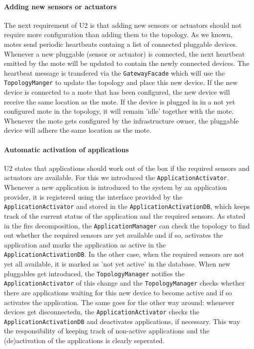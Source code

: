 \documentclass[english]{sareport}
\begin{document}
\paragraph{Adding new sensors or actuators}
The next requirement of U2 is that adding new sensors or actuators should not require more configuration than adding them to the topology. As we known, motes send periodic heartbeats containg a list of connected pluggable devices. Whenever a new pluggable (sensor or actuator) is connected, the next heartbeat emitted by the mote will be updated to contain the newly connected devices. The heartbeat message is transfered via the \texttt{GatewayFacade} which will use the \texttt{TopologyManger} to update the topology and place this new device. If the new device is connected to a mote that has been configured, the new device will receive the same location as the mote. If the device is plugged in in a not yet configured mote in the topology, it will remain 'idle' together with the mote. Whenever the mote gets configured by the infrastructure owner, the pluggable device will adhere the same location as the mote.

\paragraph{Automatic activation of applications}
U2 states that applications should work out of the box if the required sensors and actuators are available. For this we introduced the \texttt{ApplicationActivator}. Whenever a new application is introduced to the system by an application provider, it is registered using the interface provided by the \texttt{ApplicationActivator} and stored in the \texttt{ApplicationActivationDB}, which keeps track of the current status of the application and the required sensors. As stated in the firs decomposition, the \texttt{ApplicationManager} can check the topology to find out whether the required sensors are yet available and if so, activates the application and marks the application as active in the \texttt{ApplicationActivationDB}. In the other case, when the required sensors are not yet all available, it is marked as 'not yet active' in the database. When new pluggables get introduced, the \texttt{TopologyManager} notifies the \texttt{ApplicationActivator} of this change and the \texttt{TopologyManager} checks whether there are applications waiting for this new device to become active and if so activates the application. The same goes for the other way around: whenever devices get disconnectedn, the \texttt{ApplicationActivator} checks the \texttt{ApplicationActivationDB} and deactivates applications, if necessary. This way the responsibility of keeping track of non-active applications and the (de)activation of the applications is clearly seperated.
\end{document}
